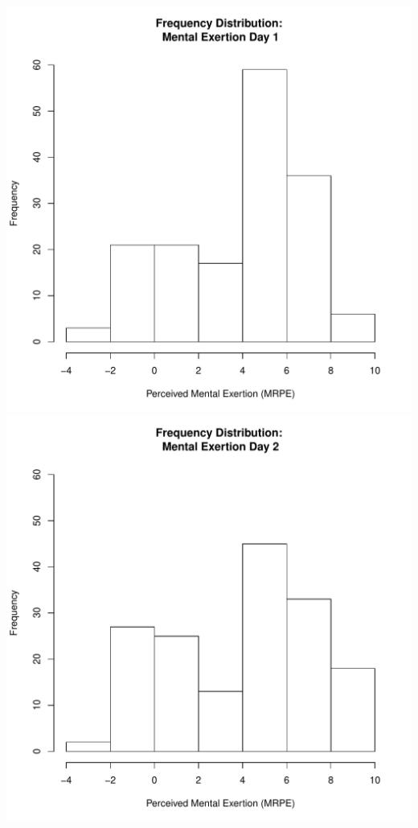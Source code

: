 \documentclass[12pt]{report}
\begin{document}
\clearpage
\includegraphics[scale =.4]{../images/distMentalDay1.pdf}
\includegraphics[scale =.4]{../images/distMentalDay2.pdf}
\end{document}
